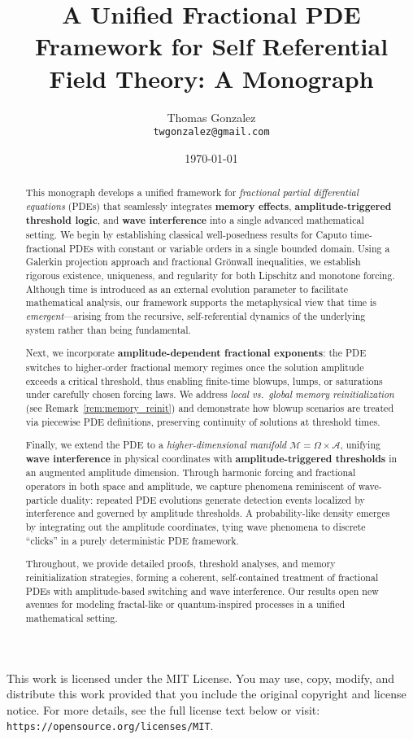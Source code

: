 \documentclass[12pt]{article}
\title{\Large \textbf{A Unified Fractional PDE Framework for Self Referential Field Theory: A Monograph}\\[6pt]
}
\author{%
  Thomas Gonzalez \\
  \small \texttt{twgonzalez@gmail.com}
}
\date{\today}
\begin{document}
\maketitle

\vfill
\noindent\hrulefill
\medskip

\noindent 
This work is licensed under the MIT License. You may use, copy, modify, and distribute this work provided that you include the original copyright and license notice.  For more details, see the full license text below or visit: \texttt{https://opensource.org/licenses/MIT}.
\medskip \\
\newpage
\noindent
\begin{abstract}
This monograph develops a unified framework for \emph{fractional partial differential equations} (PDEs) that seamlessly integrates \textbf{memory effects}, \textbf{amplitude-triggered threshold logic}, and \textbf{wave interference} into a single advanced mathematical setting. We begin by establishing classical well-posedness results for Caputo time-fractional PDEs with constant or variable orders in a single bounded domain. Using a Galerkin projection approach and fractional Gr\"onwall inequalities, we establish rigorous existence, uniqueness, and regularity for both Lipschitz and monotone forcing. Although time is introduced as an external evolution parameter to facilitate mathematical analysis, our framework supports the metaphysical view that time is \emph{emergent}—arising from the recursive, self-referential dynamics of the underlying system rather than being fundamental.

Next, we incorporate \textbf{amplitude-dependent fractional exponents}: the PDE switches to higher-order fractional memory regimes once the solution amplitude exceeds a critical threshold, thus enabling finite-time blowups, lumps, or saturations under carefully chosen forcing laws. We address \emph{local vs.\ global memory reinitialization} (see Remark~\ref{rem:memory_reinit}) and demonstrate how blowup scenarios are treated via piecewise PDE definitions, preserving continuity of solutions at threshold times.

Finally, we extend the PDE to a \emph{higher-dimensional manifold} \( \mathcal{M} = \Omega \times \mathcal{A}\), unifying \textbf{wave interference} in physical coordinates with \textbf{amplitude-triggered thresholds} in an augmented amplitude dimension. Through harmonic forcing and fractional operators in both space and amplitude, we capture phenomena reminiscent of wave-particle duality: repeated PDE evolutions generate detection events localized by interference and governed by amplitude thresholds. A probability-like density emerges by integrating out the amplitude coordinates, tying wave phenomena to discrete “clicks” in a purely deterministic PDE framework.

Throughout, we provide detailed proofs, threshold analyses, and memory reinitialization strategies, forming a coherent, self-contained treatment of fractional PDEs with amplitude-based switching and wave interference. Our results open new avenues for modeling fractal-like or quantum-inspired processes in a unified mathematical setting.
\end{abstract}
\end{document}

